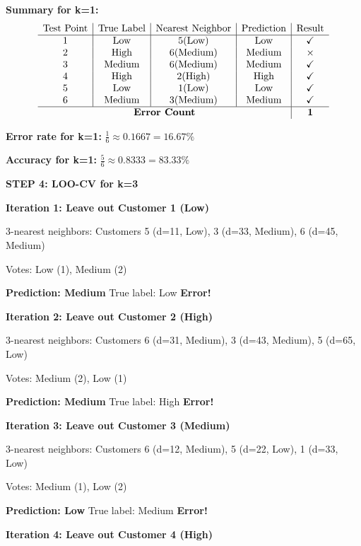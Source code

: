 \documentclass[12pt]{article}
\begin{document}
\begin{solution}
\textbf{Summary for k=1:}
\[
\begin{array}{c|c|c|c|c}
\text{Test Point} & \text{True Label} & \text{Nearest Neighbor} & \text{Prediction} & \text{Result} \\
\hline
1 & \text{Low} & 5 (\text{Low}) & \text{Low} & \checkmark \\
2 & \text{High} & 6 (\text{Medium}) & \text{Medium} & \times \\
3 & \text{Medium} & 6 (\text{Medium}) & \text{Medium} & \checkmark \\
4 & \text{High} & 2 (\text{High}) & \text{High} & \checkmark \\
5 & \text{Low} & 1 (\text{Low}) & \text{Low} & \checkmark \\
6 & \text{Medium} & 3 (\text{Medium}) & \text{Medium} & \checkmark \\
\hline
\multicolumn{4}{c|}{\textbf{Error Count}} & \mathbf{1} \\
\end{array}
\]

\textbf{Error rate for k=1:} \(\boxed{\frac{1}{6} \approx 0.1667 = 16.67\%}\)

\textbf{Accuracy for k=1:} \(\boxed{\frac{5}{6} \approx 0.8333 = 83.33\%}\)

\textbf{STEP 4: LOO-CV for k=3}

\textbf{Iteration 1: Leave out Customer 1 (Low)}

3-nearest neighbors: Customers 5 (d=11, Low), 3 (d=33, Medium), 6 (d=45, Medium)

Votes: Low (1), Medium (2)

\textbf{Prediction: Medium} \quad True label: Low \quad \textbf{Error!}

\textbf{Iteration 2: Leave out Customer 2 (High)}

3-nearest neighbors: Customers 6 (d=31, Medium), 3 (d=43, Medium), 5 (d=65, Low)

Votes: Medium (2), Low (1)

\textbf{Prediction: Medium} \quad True label: High \quad \textbf{Error!}

\textbf{Iteration 3: Leave out Customer 3 (Medium)}

3-nearest neighbors: Customers 6 (d=12, Medium), 5 (d=22, Low), 1 (d=33, Low)

Votes: Medium (1), Low (2)

\textbf{Prediction: Low} \quad True label: Medium \quad \textbf{Error!}

\textbf{Iteration 4: Leave out Customer 4 (High)}


\end{solution}
\end{document}
